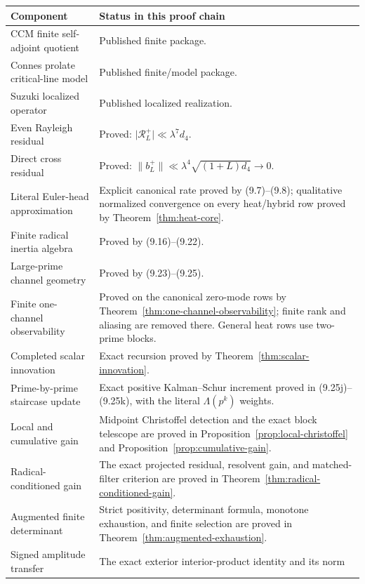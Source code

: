 \documentclass[11pt]{amsart}
\theoremstyle{definition}
\theoremstyle{remark}
\begin{document}
\begin{center}
\begin{tabular}{>{\raggedright\arraybackslash}p{}
                >{\raggedright\arraybackslash}p{}}
\toprule
Component & Status in this proof chain\\
\midrule
CCM finite self-adjoint quotient & Published finite package.\\
Connes prolate critical-line model & Published finite/model package.\\
Suzuki localized operator & Published localized realization.\\
Even Rayleigh residual & Proved:
\(\lvert\mathscr R_L^+\rvert\ll\lambda^7d_4\).\\
Direct cross residual & Proved:
\(\|b_L^+\|\ll\lambda^4\sqrt{(1+L)d_4}\to0\).\\
Literal Euler-head approximation & Explicit canonical rate proved by
(9.7)--(9.8); qualitative normalized convergence on every heat/hybrid row
proved by Theorem~\ref{thm:heat-core}.\\
Finite radical inertia algebra & Proved by (9.16)--(9.22).\\
Large-prime channel geometry & Proved by (9.23)--(9.25).\\
Finite one-channel observability & Proved on the canonical zero-mode rows by
Theorem~\ref{thm:one-channel-observability}; finite rank and aliasing are
removed there.  General heat rows use two-prime blocks.\\
Completed scalar innovation & Exact recursion proved by
Theorem~\ref{thm:scalar-innovation}.\\
Prime-by-prime staircase update & Exact positive Kalman--Schur increment
proved in (9.25j)--(9.25k), with the literal \(\Lambda(p^k)\) weights.\\
Local and cumulative gain & Midpoint Christoffel detection and the exact
block telescope are proved in Proposition~\ref{prop:local-christoffel}
and Proposition~\ref{prop:cumulative-gain}.\\
Radical-conditioned gain & The exact projected residual, resolvent gain,
and matched-filter criterion are proved in
Theorem~\ref{thm:radical-conditioned-gain}.\\
Augmented finite determinant & Strict positivity, determinant formula,
monotone exhaustion, and finite selection are proved in
Theorem~\ref{thm:augmented-exhaustion}.\\
Signed amplitude transfer & The exact exterior interior-product identity
and its norm

\end{tabular}
\end{center}
\end{document}
